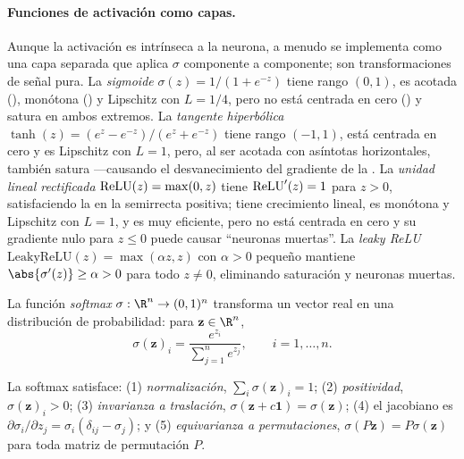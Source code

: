\paragraph{Funciones de activaci\'on como capas.}
Aunque la activaci\'on es intr\'inseca a la neurona, a menudo se implementa como
una capa separada que aplica $\sigma$ componente a componente; son
transformaciones de se\~nal pura. La \emph{sigmoide} $\sigma(z) = 1/(1+e^{-z})$
tiene rango $(0,1)$, es acotada (), mon\'otona
() y Lipschitz con $L = 1/4$, pero no est\'a centrada en
cero () y satura en ambos extremos. La \emph{tangente
hiperb\'olica} $\tanh(z) = (e^z - e^{-z})/(e^z + e^{-z})$ tiene rango $(-1,1)$,
est\'a centrada en cero y es Lipschitz con $L = 1$, pero, al ser acotada con
as\'intotas horizontales, tambi\'en satura ---causando el desvanecimiento del
gradiente de la . La \emph{unidad lineal rectificada}
$\operatorname{ReLU}(z) = \max(0, z)$ tiene $\operatorname{ReLU}'(z) = 1$ para $z > 0$, satisfaciendo la
 en la semirrecta positiva; tiene crecimiento
lineal, es mon\'otona y Lipschitz con $L=1$, y es muy eficiente, pero no est\'a
centrada en cero y su gradiente nulo para $z \le 0$ puede causar ``neuronas
muertas''. La \emph{leaky ReLU} $\mathrm{LeakyReLU}(z) = \max(\alpha z, z)$ con
$\alpha > 0$ peque\~no mantiene $\abs{\sigma'(z)} \ge \alpha > 0$ para todo
$z \ne 0$, eliminando saturaci\'on y neuronas muertas.

\begin{definition}[Softmax]
\label{def:found:softmax}
La funci\'on \emph{softmax} $\sigma : \R^n \to (0,1)^n$ transforma un vector real
en una distribuci\'on de probabilidad: para $\mathbf{z} \in \R^n$,
\[
  \sigma(\mathbf{z})_i = \frac{e^{z_i}}{\sum_{j=1}^n e^{z_j}}, \qquad
  i = 1, \ldots, n.
\]
\end{definition}

\begin{proposition}
\label{prop:found:softmax}
La softmax satisface: (1) \emph{normalizaci\'on}, $\sum_i \sigma(\mathbf{z})_i =
1$; (2) \emph{positividad}, $\sigma(\mathbf{z})_i > 0$; (3) \emph{invarianza a
traslaci\'on}, $\sigma(\mathbf{z} + c\mathbf{1}) = \sigma(\mathbf{z})$; (4) el
jacobiano es $\partial \sigma_i / \partial z_j = \sigma_i(\delta_{ij} -
\sigma_j)$; y (5) \emph{equivarianza a permutaciones}, $\sigma(P\mathbf{z}) =
P\sigma(\mathbf{z})$ para toda matriz de permutaci\'on $P$.
\end{proposition}

